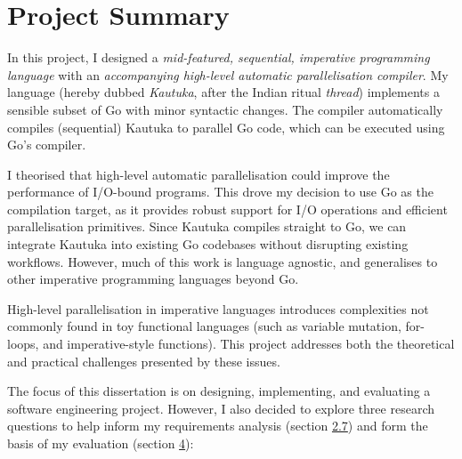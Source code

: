 \section{Project Summary}
\label{sec:1.1}

In this project, I designed a \textit{mid-featured, sequential, imperative programming language} with an \textit{accompanying high-level automatic parallelisation compiler}. My language (hereby dubbed \textit{Kautuka}, after the Indian ritual \textit{thread}) implements a sensible subset of Go with minor syntactic changes. The compiler automatically compiles (sequential) Kautuka to parallel Go code, which can be executed using Go's compiler.

I theorised that high-level automatic parallelisation could improve the performance of I/O-bound programs. This drove my decision to use Go as the compilation target, as it provides robust support for I/O operations and efficient parallelisation primitives. Since Kautuka compiles straight to Go, we can integrate Kautuka into existing Go codebases without disrupting existing workflows. However, much of this work is language agnostic, and generalises to other imperative programming languages beyond Go. 

High-level parallelisation in imperative languages introduces complexities not commonly found in toy functional languages (such as variable mutation, for-loops, and imperative-style functions). This project addresses both the theoretical and practical challenges presented by these issues.

The focus of this dissertation is on designing, implementing, and evaluating a software engineering project. However, I also decided to explore three research questions to help inform my requirements analysis (section \hyperref[sec:2.7]{2.7}) and form the basis of my evaluation (section \hyperref[sec:4]{4}):

